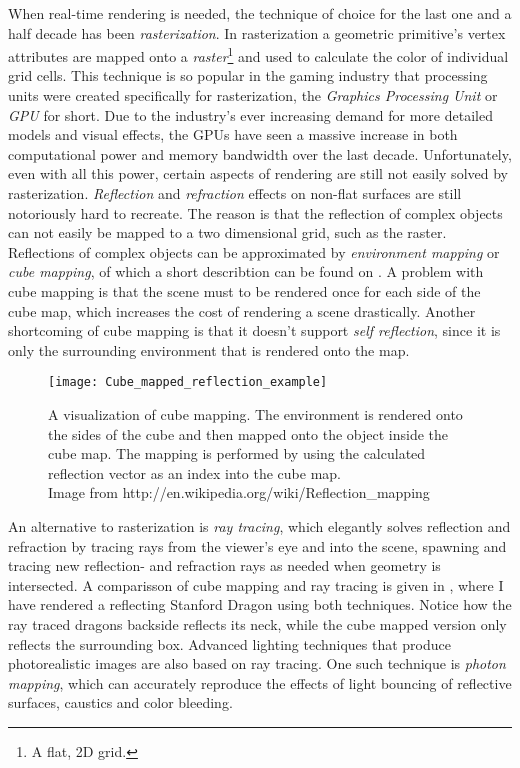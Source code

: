 When real-time rendering is needed, the technique of choice for the last one and
a half decade has been \textit{rasterization}. In rasterization a geometric
primitive's vertex attributes are mapped onto a \textit{raster}\footnote{A flat,
  2D grid.} and used to calculate the color of individual grid cells. This
technique is so popular in the gaming industry that processing units were
created specifically for rasterization, the \textit{Graphics Processing Unit} or
\textit{GPU} for short. Due to the industry's ever increasing demand for more
detailed models and visual effects, the GPUs have seen a massive increase in
both computational power and memory bandwidth over the last
decade. Unfortunately, even with all this power, certain aspects of rendering are
still not easily solved by rasterization. \textit{Reflection} and
\textit{refraction} effects on non-flat surfaces are still notoriously hard to
recreate. The reason is that the reflection of complex objects can not easily be
mapped to a two dimensional grid, such as the raster. Reflections of complex
objects can be approximated by \textit{environment mapping} or \textit{cube
  mapping}, of which a short describtion can be found on . A
problem with cube mapping is that the scene must to be rendered once for each
side of the cube map, which increases the cost of rendering a scene
drastically. Another shortcoming of cube mapping is that it doesn't support
\textit{self reflection}, since it is only the surrounding environment that is
rendered onto the map.

\begin{figure}
  \centering
  \texttt{[image: Cube\_mapped\_reflection\_example]}

  \vspace{3mm}
  \parbox{9.5cm}{\caption[Cube mapping visualized.]{A visualization of cube
      mapping. The environment is rendered onto the sides of the cube and then
      mapped onto the object inside the cube map. The mapping is performed by
      using the calculated reflection vector as an index into the cube
      map.\\Image from
      http://en.wikipedia.org/wiki/Reflection\_mapping}\label{fig:cubemap}}
\end{figure}


An alternative to rasterization is \textit{ray tracing}, which elegantly solves
reflection and refraction by tracing rays from the viewer's eye and into the
scene, spawning and tracing new reflection- and refraction rays as needed when
geometry is intersected. A comparisson of cube mapping and ray tracing is given
in , where I have rendered a reflecting Stanford
Dragon using both techniques. Notice how the ray traced dragons backside
reflects its neck, while the cube mapped version only reflects the surrounding
box. Advanced lighting techniques that produce photorealistic images are also
based on ray tracing. One such technique is \textit{photon mapping}, which can
accurately reproduce the effects of light bouncing of reflective surfaces,
caustics and color bleeding.

